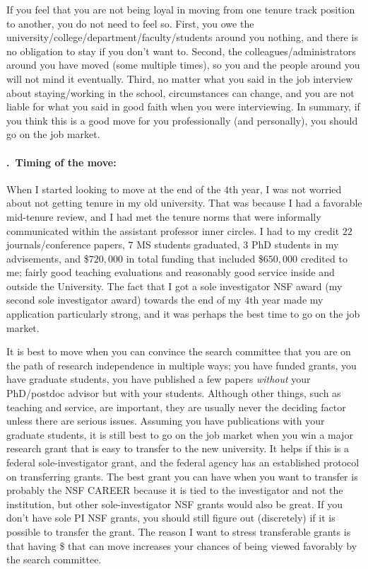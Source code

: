 \documentclass[14pt]{article}
\newcounter{myparagraph}
\renewcommand{\themyparagraph}{\arabic{myparagraph}}
\newcommand{\nparagraph}[1]{%
  \refstepcounter{myparagraph}%
  \paragraph{\themyparagraph.~#1}%
}
\begin{document}
If you feel that you are not being loyal in moving from one tenure track position to another, you do not need to feel so. First, you owe the university/college/department/faculty/students around you nothing, and there is no obligation to stay if you don't want to. Second, the colleagues/administrators around you have moved (some multiple times), so you and the people around you will not mind it eventually. Third, no matter what you said in the job interview about staying/working in the school, circumstances can change, and you are not liable for what you said in good faith when you were interviewing. In summary, if you think this is a good move for you professionally (and personally), you should go on the job market.

\nparagraph{Timing of the move:} When I started looking to move at the end of the $4$th year, I was not worried about not getting tenure in my old university. That was because I had a favorable mid-tenure review, and I had met the tenure norms that were informally communicated within the assistant professor inner circles. I had to my credit $22$ journals/conference papers, $7$ MS students graduated, $3$ PhD students in my advisements, and \$$720,000$ in total funding that included \$$650,000$ credited to me; fairly good teaching evaluations and reasonably good service inside and outside the University. The fact that I got a sole investigator NSF award (my second sole investigator award) towards the end of my $4$th year made my application particularly strong, and it was perhaps the best time to go on the job market.

It is best to move when you can convince the search committee that you are on the path of research independence in multiple ways; you have funded grants, you have graduate students, you have published a few papers {\it without} your PhD/postdoc advisor but with your students. Although other things, such as teaching and service, are important, they are usually never the deciding factor unless there are serious issues. Assuming you have publications with your graduate students, it is still best to go on the job market when you win a major research grant that is easy to transfer to the new university. It helps if this is a federal sole-investigator grant, and the federal agency has an established protocol on transferring grants. The best grant you can have when you want to transfer is probably the NSF CAREER because it is tied to the investigator and not the institution, but other sole-investigator NSF grants would also be great. If you don't have sole PI NSF grants, you should still figure out (discretely) if it is possible to transfer the grant. The reason I want to stress transferable grants is that having \$ that can move increases your chances of being viewed favorably by the search committee.
\end{document}
